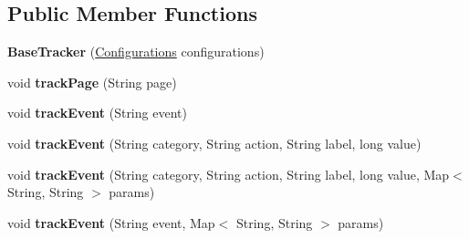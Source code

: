 \subsection*{Public Member Functions}
\begin{DoxyCompactItemize}
\item 
\hypertarget{classcom_1_1spilgames_1_1framework_1_1tracking_1_1impl_1_1_base_tracker_a6aa1b67f4c17013e16ce6f777c8c36a4}{{\bfseries Base\-Tracker} (\hyperlink{classcom_1_1spilgames_1_1framework_1_1data_1_1_configurations}{Configurations} configurations)}\label{classcom_1_1spilgames_1_1framework_1_1tracking_1_1impl_1_1_base_tracker_a6aa1b67f4c17013e16ce6f777c8c36a4}

\item 
\hypertarget{classcom_1_1spilgames_1_1framework_1_1tracking_1_1impl_1_1_base_tracker_a53b3107dbcf4a954715842acb4b700d9}{void {\bfseries track\-Page} (String page)}\label{classcom_1_1spilgames_1_1framework_1_1tracking_1_1impl_1_1_base_tracker_a53b3107dbcf4a954715842acb4b700d9}

\item 
\hypertarget{classcom_1_1spilgames_1_1framework_1_1tracking_1_1impl_1_1_base_tracker_aa08cdd5e1211f173a7e37d073e309cf3}{void {\bfseries track\-Event} (String event)}\label{classcom_1_1spilgames_1_1framework_1_1tracking_1_1impl_1_1_base_tracker_aa08cdd5e1211f173a7e37d073e309cf3}

\item 
\hypertarget{classcom_1_1spilgames_1_1framework_1_1tracking_1_1impl_1_1_base_tracker_addb5c25d03b4b849512c3bca4d98400f}{void {\bfseries track\-Event} (String category, String action, String label, long value)}\label{classcom_1_1spilgames_1_1framework_1_1tracking_1_1impl_1_1_base_tracker_addb5c25d03b4b849512c3bca4d98400f}

\item 
\hypertarget{classcom_1_1spilgames_1_1framework_1_1tracking_1_1impl_1_1_base_tracker_a9448883272dee0414a6a9ce891e6a8dc}{void {\bfseries track\-Event} (String category, String action, String label, long value, Map$<$ String, String $>$ params)}\label{classcom_1_1spilgames_1_1framework_1_1tracking_1_1impl_1_1_base_tracker_a9448883272dee0414a6a9ce891e6a8dc}

\item 
\hypertarget{classcom_1_1spilgames_1_1framework_1_1tracking_1_1impl_1_1_base_tracker_adeda7bcb92163b1a43af2696446bb551}{void {\bfseries track\-Event} (String event, Map$<$ String, String $>$ params)}\label{classcom_1_1spilgames_1_1framework_1_1tracking_1_1impl_1_1_base_tracker_adeda7bcb92163b1a43af2696446bb551}


\end{DoxyCompactItemize}
